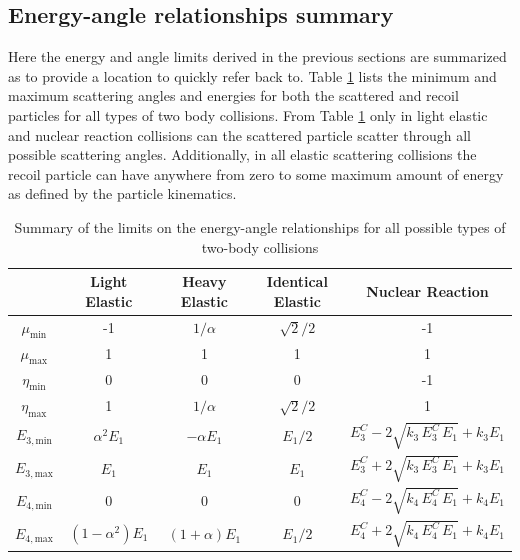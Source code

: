 \documentclass[../main.tex]{subfiles}
\begin{document}
\subsection{Energy-angle relationships summary}
Here the energy and angle limits derived in the previous sections are summarized as to provide a location to quickly refer back to. Table \ref{tab:particle-kinematics} lists the minimum and maximum scattering angles and energies for both the scattered and recoil particles for all types of two body collisions. From Table \ref{tab:particle-kinematics} only in light elastic and nuclear reaction collisions can the scattered particle scatter through all possible scattering angles. Additionally, in all elastic scattering collisions the recoil particle can have anywhere from zero to some maximum amount of energy as defined by the particle kinematics.
\begin{table}[!htb]
  \centering
  \caption{Summary of the limits on the energy-angle relationships for all possible types of two-body collisions}
  \label{tab:particle-kinematics}
  \begin{tabular}{c|c|c|c|c}
  \hline
              & Light Elastic & Heavy Elastic & Identical Elastic & Nuclear Reaction \\ \hline
  $\mu_{\text{min}}$ & -1 & $1 / \alpha$ & $\sqrt{2}/2$ & -1 \\
  $\mu_{\text{max}}$ & 1 & 1 & 1 & 1 \\
  $\eta_{\text{min}}$ & 0 & 0 & 0 & -1 \\
  $\eta_{\text{max}}$ & 1 & $1 / \alpha$ & $\sqrt{2}/2$ & 1 \\
  $E_{3,\text{min}}$  & $\alpha^2 E_1$ & $-\alpha E_{1}$ & $E_1/2$ & $E_3^C - 2 \sqrt{k_3 \, E_3^C \, E_1} + k_3 E_1$ \\
  $E_{3,\text{max}}$  & $E_1$ & $E_1$ & $E_1$ & $E_3^C + 2 \sqrt{k_3 \, E_3^C \, E_1} + k_3 E_1$ \\
  $E_{4,\text{min}}$  & 0 & 0 & 0 & $E_4^C - 2 \sqrt{k_4 \, E_4^C \, E_1} + k_4 E_1$ \\
  $E_{4,\text{max}}$  & $\left(1 - \alpha^2\right) E_1$ & $\left(1 + \alpha\right) E_{1}$ & $E_1 / 2$ & $E_4^C + 2 \sqrt{k_4 \, E_4^C \, E_1} + k_4 E_1$ \\ \hline
  \end{tabular}
\end{table}

\end{document}
